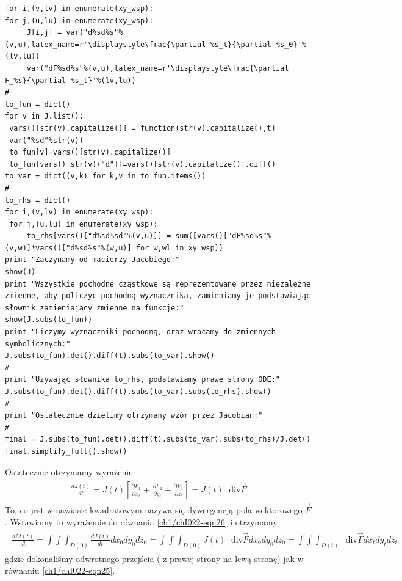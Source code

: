 \documentclass[a4paper,12pt,polish]{sphinxmanual}
\begin{document}
\begin{verbatim}
for i,(v,lv) in enumerate(xy_wsp):
for j,(u,lu) in enumerate(xy_wsp):
     J[i,j] = var("d%sd%s"%(v,u),latex_name=r'\displaystyle\frac{\partial %s_t}{\partial %s_0}'%(lv,lu))
     var("dF%sd%s"%(v,u),latex_name=r'\displaystyle\frac{\partial F_%s}{\partial %s_t}'%(lv,lu))
#
to_fun = dict()
for v in J.list():
 vars()[str(v).capitalize()] = function(str(v).capitalize(),t)
 var("%sd"%str(v))
 to_fun[v]=vars()[str(v).capitalize()]
 to_fun[vars()[str(v)+"d"]]=vars()[str(v).capitalize()].diff()
to_var = dict((v,k) for k,v in to_fun.items())
#
to_rhs = dict()
for i,(v,lv) in enumerate(xy_wsp):
 for j,(u,lu) in enumerate(xy_wsp):
     to_rhs[vars()["d%sd%sd"%(v,u)]] = sum([vars()["dF%sd%s"%(v,w)]*vars()["d%sd%s"%(w,u)] for w,wl in xy_wsp])
print "Zaczynamy od macierzy Jacobiego:"
show(J)
print "Wszystkie pochodne cząstkowe są reprezentowane przez niezależne zmienne, aby policzyc pochodną wyznacznika, zamieniamy je podstawiając słownik zamieniający zmienne na funkcje:"
show(J.subs(to_fun))
print "Liczymy wyznaczniki pochodną, oraz wracamy do zmiennych symbolicznych:"
J.subs(to_fun).det().diff(t).subs(to_var).show()
#
print "Uzywając słownika to_rhs, podstawiamy prawe strony ODE:"
J.subs(to_fun).det().diff(t).subs(to_var).subs(to_rhs).show()
#
print "Ostatecznie dzielimy otrzymany wzór przez Jacobian:"
#
final = J.subs(to_fun).det().diff(t).subs(to_var).subs(to_rhs)/J.det()
final.simplify_full().show()
\end{verbatim}


Ostatecznie otrzymamy wyrażenie
\label{ch1/chI022:equation-eqn32}\begin{gather}
\begin{split}\frac{dJ(t)}{dt} = J(t) \left[\frac{\partial F_1}{\partial  x_t} + \frac{\partial  F_2}{\partial  y_t} + \frac{\partial F_3}{\partial z_t} \right]  = J(t)\; \mbox{ div} \vec F\end{split}\label{ch1/chI022-eqn32}
\end{gather}
To, co jest w nawiasie kwadratowym  nazywa się dywergencją pola wektorowego $\vec F$. Wstawiamy to wyrażemie do równania \eqref{ch1/chI022-eqn26} i otrzymamy
\label{ch1/chI022:equation-eqn33}\begin{gather}
\begin{split}\frac{dM(t)}{dt} = \int \int \int_{D(0)}  \frac{ dJ(t)}{dt}  dx_0 dy_0 dz_0   = \int \int \int_{D(0)} J(t)\; \mbox{ div} \vec F  dx_0 dy_0 dz_0  =  \int \int \int_{D(t)} \; \mbox{ div} \vec F  dx_t dy_t dz_t \qquad\end{split}\label{ch1/chI022-eqn33}
\end{gather}
gdzie dokonaliśmy odwrotnego przejścia  ( z prawej strony na lewą stronę) jak  w równaniu \eqref{ch1/chI022-eqn25}.
\end{document}
